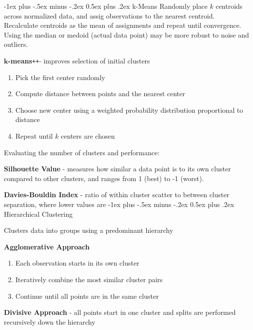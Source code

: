 \documentclass[10pt,landscape]{article}
\makeatletter
\renewcommand{\subsection}{\@startsection{subsection}{2}{0mm}%
                                {-1ex plus -.5ex minus -.2ex}%
                                {0.5ex plus .2ex}%
                                {\normalfont\normalsize\bfseries}}
\makeatother
\begin{document}
\begin{multicols}{3}
\subsection{k-Means}
Randomly place $k$ centroids across normalized data, and assig observations to the nearest centroid. Recalculate centroids as the mean of assignments and repeat until convergence. Using the median or medoid (actual data point) may be more robust to noise and outliers.

\def\Plus{\texttt{+}}
$\boldsymbol{k}$\textbf{-means}\Plus\Plus\hspace{1mm}- improves selection of initial clusters
\begin{enumerate}[leftmargin=5mm]
\itemsep -.4mm 
\item Pick the first center randomly
\item Compute distance between points and the nearest center
\item Choose new center using a weighted probability distribution proportional to distance
\item Repeat until $k$ centers are chosen
\end{enumerate}

Evaluating the number of clusters and performance:

\textbf{Silhouette Value} - measures how similar a data point is to its own cluster compared to other clusters, and ranges from 1 (best) to -1 (worst).

\textbf{Davies-Bouldin Index} - ratio of within cluster scatter to between cluster separation, where lower values are 
\subsection{Hierarchical Clustering}

Clusters data into groups using a predominant hierarchy 

\textbf{Agglomerative Approach}
\begin{enumerate}[leftmargin=5mm]
\itemsep -.4mm 
\item Each observation starts in its own cluster
\item Iteratively combine the most similar cluster pairs 
\item Continue until all points are in the same cluster
\end{enumerate}

\textbf{Divisive Approach} - all points start in one cluster and splits are performed recursively down the hierarchy


\end{multicols}
\end{document}

